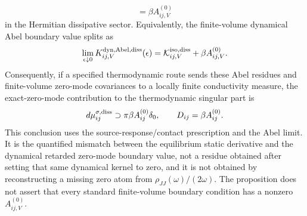 \begin{proposition}
\begin{equation}
  =
  \beta A^{(0)}_{ij,V}
  \label{eq:kubo-static-dynamic-zero-mode-mismatch}
\end{equation}
in the Hermitian dissipative sector.  Equivalently, the finite-volume
dynamical Abel boundary value splits as
\[
  \lim_{\epsilon\downarrow0}
  K^{\rm dyn,Abel,diss}_{ij,V}(\epsilon)
  =
  \mathcal K^{\rm iso,diss}_{ij,V}
  +
  \beta A^{(0)}_{ij,V}.
\]
Consequently, if a specified thermodynamic route sends these Abel residues
and finite-volume zero-mode covariances to a locally finite conductivity
measure, the exact-zero-mode contribution to the thermodynamic singular part
is
\begin{equation}
  d\mu^{\sigma,\rm diss}_{ij}
  \supset
  \pi\beta A^{(0)}_{ij}\delta_0,
  \qquad
  D_{ij}=\beta A^{(0)}_{ij}.
  \label{eq:kubo-source-response-drude-normalization}
\end{equation}
This conclusion uses the source-response/contact prescription and the Abel
limit.  It is the quantified mismatch between the equilibrium static
derivative and the dynamical retarded zero-mode boundary value, not a residue
obtained after setting that same dynamical kernel to zero, and it is not
obtained by reconstructing a missing zero atom from
\(\rho_{JJ}(\omega)/(2\omega)\).  The proposition does not assert that every
standard finite-volume boundary condition has a nonzero \(A^{(0)}_{ij,V}\).
\end{proposition}

